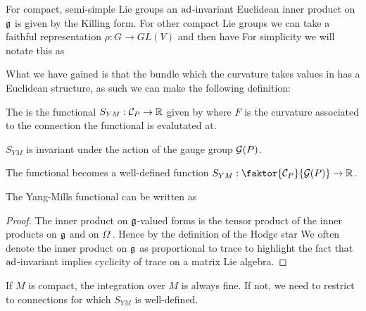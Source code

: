 \documentclass{article}
\begin{document}
\begin{remark}
For compact, semi-simple Lie groups an $\operatorname{ad}$-invariant Euclidean inner product on $\mathfrak{g}$ is given by the Killing form. For other compact Lie groups we can take a faithful representation $\rho : G \to GL(V)$ and then have 
For simplicity we will notate this as 
\end{remark}

What we have gained is that the bundle which the curvature takes values in has a Euclidean structure, as such we can make the following definition:

\begin{definition}
	The  is the functional $S_{YM}:\mathcal{C}_P \to \mathbb{R}$ given by 
where $F$ is the curvature associated to the connection the functional is evalutated at. 
\end{definition}

\begin{lemma}
	$S_{YM}$ is invariant under the action of the gauge group $\mathcal{G}(P)$. 
\end{lemma}

\begin{corollary}
	The functional becomes a well-defined function $S_{YM} : \faktor{\mc{C}_P}{\mc{G}(P)} \to \mbb{R}$. 
\end{corollary}

\begin{lemma}
	The Yang-Mills functional can be written as
\end{lemma}
\begin{proof}
	The inner product on $\mathfrak{g}$-valued forms is the tensor product of the inner products on $\mathfrak{g}$ and on $\Omega^\cdot$. Hence by the definition of the Hodge star
We often denote the inner product on $\mathfrak{g}$ as proportional to trace to highlight the fact that $\operatorname{ad}$-invariant implies cyclicity of trace on a matrix Lie algebra. 
\end{proof}

\begin{remark}
	If $M$ is compact, the integration over $M$ is always fine. If not, we need to restrict to connections for which $S_{YM}$ is well-defined. 
\end{remark}
\end{document}
